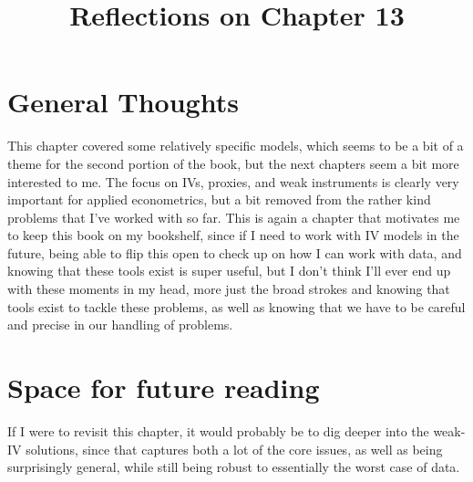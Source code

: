\documentclass[10pt, english]{article}
\begin{document}
\title{Reflections on Chapter 13}
\date{}
\author{}

\maketitle


\section*{General Thoughts}
This chapter covered some relatively specific models, which seems to be a bit of a theme
for the second portion of the book, but the next chapters seem a bit more interested to me.
The focus on IVs, proxies, and weak instruments is clearly very important for applied 
econometrics, but a bit removed from the rather kind problems that I've worked with so far.
This is again a chapter that motivates me to keep this book on my bookshelf, since if I need to work 
with IV models in the future, being able to flip this open to check up on how I can work with data,
and knowing that these tools exist is super useful, but I don't think I'll ever end up with these
moments in my head, more just the broad strokes and knowing that tools exist to tackle these problems, as
well as knowing that we have to be careful and precise in our handling of problems.

\section*{Space for future reading}
If I were to revisit this chapter, it would probably be to dig deeper into the weak-IV solutions,
since that captures both a lot of the core issues, as well as being surprisingly general, while still
being robust to essentially the worst case of data.
\end{document}
